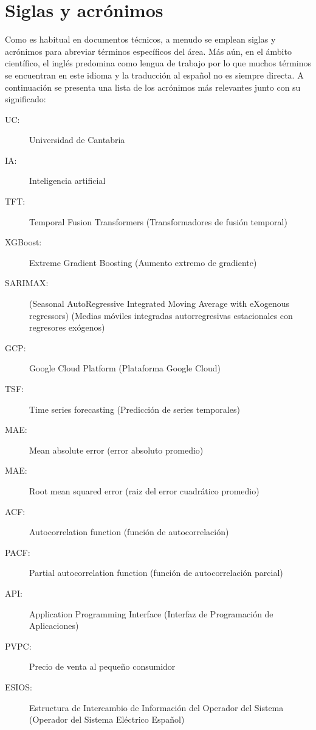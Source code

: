 \clearpage
\hypersetup{linkcolor=black}
\tableofcontents\clearpage
\listoffigures\clearpage
\hypersetup{linkcolor=linkscolor}

\chapter*{Siglas y acrónimos}
%
%
Como es habitual en documentos técnicos, a menudo se emplean siglas y acrónimos para abreviar términos específicos del área. Más aún, en el ámbito científico, el inglés predomina como lengua de trabajo por lo que muchos términos se encuentran en este idioma y la traducción al español no es siempre directa. A continuación se presenta una lista de los acrónimos más relevantes junto con su significado:
%
%
\begin{description}
    \item[UC:] Universidad de Cantabria
    \item[IA:] Inteligencia artificial
    \item[TFT:]  Temporal Fusion Transformers (Transformadores de fusión temporal)
    \item[XGBoost:] Extreme Gradient Boosting (Aumento extremo de gradiente)
    \item[SARIMAX:] (Seasonal AutoRegressive Integrated Moving Average with eXogenous regressors) (Medias móviles integradas autorregresivas estacionales con regresores exógenos)
    \item[GCP:] Google Cloud Platform (Plataforma Google Cloud)
    \item[TSF:] Time series forecasting (Predicción de series temporales)
    \item[MAE:] Mean absolute error (error absoluto promedio)
    \item[MAE:] Root mean squared error (raiz del error cuadrático promedio)
    \item[ACF:] Autocorrelation function (función de autocorrelación)
    \item[PACF:] Partial autocorrelation function (función de autocorrelación parcial)
    \item[API:] Application Programming Interface (Interfaz de Programación de Aplicaciones)
    \item[PVPC:] Precio de venta al pequeño consumidor 
    \item[ESIOS:] Estructura de Intercambio de Información del Operador del Sistema (Operador del Sistema Eléctrico Español)  
\end{description}

